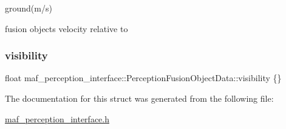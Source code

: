 ground(m/s) 

fusion objects velocity relative to \mbox{\label{structmaf__perception__interface_1_1PerceptionFusionObjectData_ab0bcd083940f87615d4663ad9224dee4}} 
\subsubsection{\texorpdfstring{visibility}{visibility}}
{\footnotesize\ttfamily float maf\+\_\+perception\+\_\+interface\+::\+Perception\+Fusion\+Object\+Data\+::visibility \{\}}



The documentation for this struct was generated from the following file\+:\begin{DoxyCompactItemize}
\item 
\hyperlink{maf__perception__interface_8h}{maf\+\_\+perception\+\_\+interface.\+h}\end{DoxyCompactItemize}
